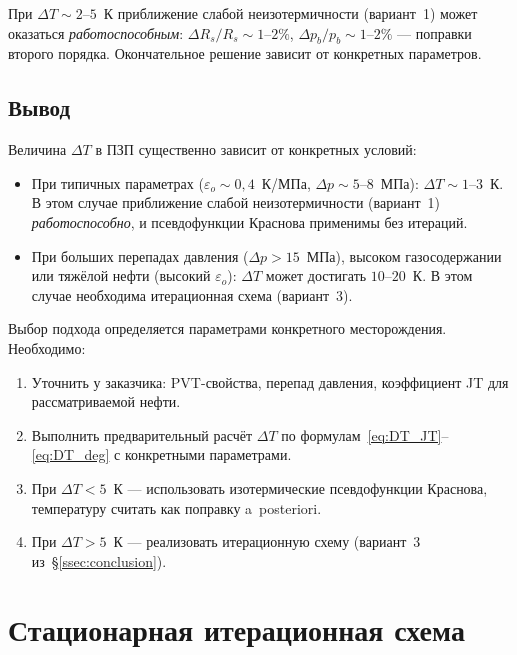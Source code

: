 ﻿\documentclass[12pt,a4paper]{article}
\begin{document}
При $\Delta T \sim 2$--$5$~К приближение слабой
неизотермичности (вариант~1) может оказаться
\emph{работоспособным}: $\Delta R_s / R_s \sim 1$--$2\%$,
$\Delta p_b / p_b \sim 1$--$2\%$ --- поправки второго порядка.
Окончательное решение зависит от конкретных параметров.

\subsection{Вывод}\label{ssec:scales_conclusion}

Величина $\Delta T$ в ПЗП существенно зависит от конкретных
условий:
\begin{itemize}[nosep]
  \item При типичных параметрах ($\varepsilon_o \sim 0{,}4$~К/МПа,
        $\Delta p \sim 5$--$8$~МПа): $\Delta T \sim 1$--$3$~К.
        В этом случае приближение слабой неизотермичности
        (вариант~1) \emph{работоспособно}, и псевдофункции
        Краснова применимы без итераций.
  \item При больших перепадах давления ($\Delta p > 15$~МПа),
        высоком газосодержании или тяжёлой нефти (высокий
        $\varepsilon_o$): $\Delta T$ может достигать $10$--$20$~К.
        В этом случае необходима итерационная схема (вариант~3).
\end{itemize}

Выбор подхода определяется параметрами конкретного
месторождения. Необходимо:
\begin{enumerate}[nosep]
  \item Уточнить у заказчика: PVT-свойства, перепад давления,
        коэффициент JT для рассматриваемой нефти.
  \item Выполнить предварительный расчёт $\Delta T$
        по формулам~\eqref{eq:DT_JT}--\eqref{eq:DT_deg}
        с конкретными параметрами.
  \item При $\Delta T < 5$~К --- использовать изотермические
        псевдофункции Краснова, температуру считать как
        поправку a~posteriori.
  \item При $\Delta T > 5$~К --- реализовать итерационную
        схему (вариант~3 из~\S\ref{ssec:conclusion}).
\end{enumerate}


\section{Стационарная итерационная схема}\label{sec:stationary}
\end{document}
